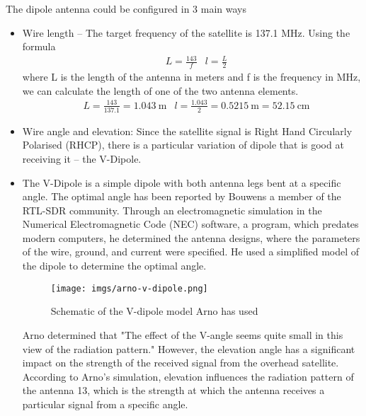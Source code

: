 \documentclass{article}
\begin{document}
\begin{itemize}
        The dipole antenna could be configured in 3 main ways
        \begin{itemize}
            \item Wire length -- The target frequency of the satellite is 137.1 MHz. Using the formula
            \begin{align}
                & L = \frac{143}{f}
                & l = \frac{L}{2}
            \end{align}
            where L is the length of the antenna in meters and f is the frequency in MHz, we can calculate the length of one of the two antenna elements. 
            \begin{align}
                & L = \frac{143}{137.1} = \SI{1.043}{\metre}
                & l = \frac{1.043}{2} = \SI{0.5215}{\metre} = \SI{52.15}{\centi\metre}
            \end{align}
            \item Wire angle and elevation: Since the satellite signal is Right Hand Circularly Polarised (RHCP), there is a particular variation of dipole that is good at receiving it – the V-Dipole. 
            \item[] The V-Dipole is a simple dipole with both antenna legs bent at a specific angle. The optimal angle has been reported by Bouwens\cite{22} a member of the RTL-SDR community. Through an electromagnetic simulation in the Numerical Electromagnetic Code (NEC) software, a program, which predates modern computers, he determined the antenna designs, where the parameters of the wire, ground, and current were specified. He used a simplified model of the dipole to determine the optimal angle.

            \begin{figure}[H]
                \centering
                \texttt{[image: imgs/arno-v-dipole.png]}
                \caption{Schematic of the V-dipole model Arno has used \cite{12}}
                \label{dipole-simple-img}
            \end{figure}

            Arno\cite{12} determined that "The effect of the V-angle seems quite small in this view of the radiation pattern." However, the elevation angle has a significant impact on the strength of the received signal from the overhead satellite. According to Arno's simulation\cite{12}, elevation influences the radiation pattern of the antenna 13, which is the strength at which the antenna receives a particular signal from a specific angle.
            

\end{itemize}
\end{itemize}
\end{document}
